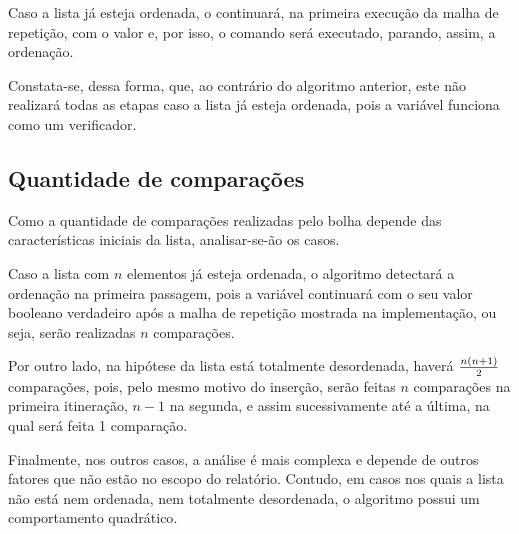 Caso a lista já esteja ordenada, o  continuará, na primeira execução da malha de repetição, com o valor  e, por isso, o comando  será executado, parando, assim, a ordenação.

Constata-se, dessa forma, que, ao contrário do algoritmo anterior, este não realizará todas as etapas caso a lista já esteja ordenada, pois a variável\linebreak {} funciona como um verificador.

\subsection{Quantidade de comparações}
Como a quantidade de comparações realizadas pelo bolha depende das características iniciais da lista, analisar-se-ão os casos. 

Caso a lista com $n$ elementos já esteja ordenada, o algoritmo detectará a ordenação na primeira passagem, pois a variável  continuará com o seu valor booleano verdadeiro após a malha de repetição mostrada na implementação, ou seja, serão realizadas $n$ comparações.

Por outro lado, na hipótese da lista está totalmente desordenada, haverá $n(n+1)\over 2$ comparações, pois, pelo mesmo motivo do inserção, serão feitas $n$ comparações na primeira itineração, $n-1$ na segunda, e assim sucessivamente até a última, na qual será feita 1 comparação.

Finalmente, nos outros casos, a análise é mais complexa e depende de outros fatores que não estão no escopo do relatório. Contudo, em casos nos quais a lista não está nem ordenada, nem totalmente desordenada, o algoritmo possui um comportamento quadrático\cite{bubblecomplexity}.